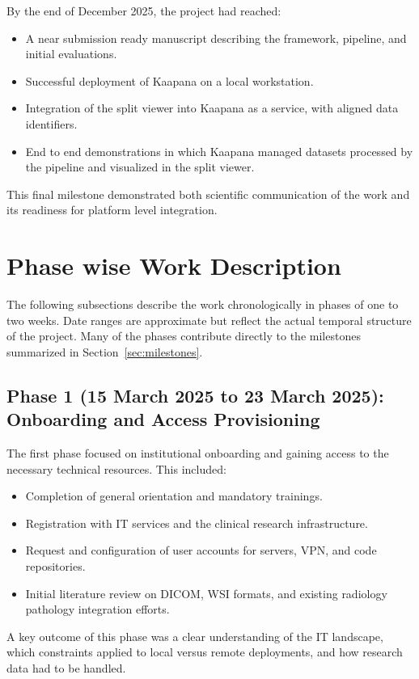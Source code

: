 \documentclass[11pt,a4paper]{article}
\begin{document}
By the end of December 2025, the project had reached:
\begin{itemize}
    \item A near submission ready manuscript describing the framework, pipeline, and initial evaluations.
    \item Successful deployment of Kaapana on a local workstation.
    \item Integration of the split viewer into Kaapana as a service, with aligned data identifiers.
    \item End to end demonstrations in which Kaapana managed datasets processed by the pipeline and visualized in the split viewer.
\end{itemize}
This final milestone demonstrated both scientific communication of the work and its readiness for platform level integration.

\section{Phase wise Work Description}
\label{sec:phases}

The following subsections describe the work chronologically in phases of one to two weeks. Date ranges are approximate but reflect the actual temporal structure of the project. Many of the phases contribute directly to the milestones summarized in Section~\ref{sec:milestones}.

\subsection*{Phase 1 (15 March 2025 to 23 March 2025): Onboarding and Access Provisioning}

The first phase focused on institutional onboarding and gaining access to the necessary technical resources. This included:

\begin{itemize}
    \item Completion of general orientation and mandatory trainings.
    \item Registration with IT services and the clinical research infrastructure.
    \item Request and configuration of user accounts for servers, VPN, and code repositories.
    \item Initial literature review on DICOM, WSI formats, and existing radiology pathology integration efforts.
\end{itemize}

A key outcome of this phase was a clear understanding of the IT landscape, which constraints applied to local versus remote deployments, and how research data had to be handled.
\end{document}
